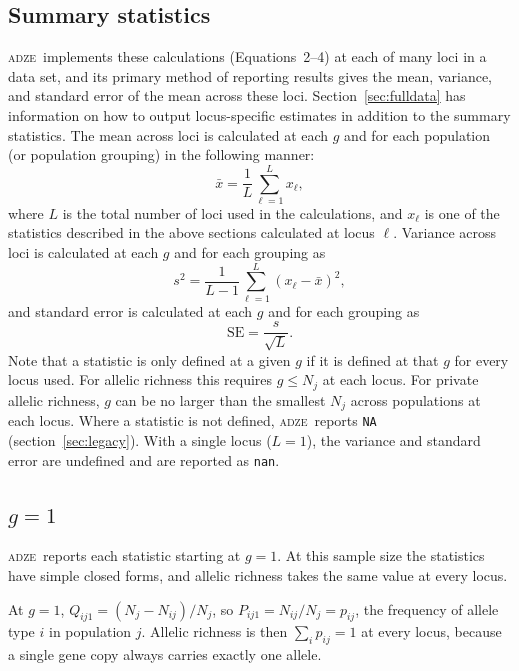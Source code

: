 \documentclass[11pt]{article}
\newcommand{\prog}{\textsc{adze}}
\begin{document}
\subsection{Summary statistics}
\label{sec:summarystats}

\prog\ implements these calculations (Equations~2--4) at each of many loci in
a data set, and its primary method of reporting results gives the mean,
variance, and standard error of the mean across these loci.
Section~\ref{sec:fulldata} has information on how to output locus-specific
estimates in addition to the summary statistics. The mean across loci is
calculated at each $g$ and for each population (or population grouping) in the
following manner:
\begin{equation}
  \bar{x} = \frac{1}{L} \sum_{\ell=1}^{L} x_\ell,
\end{equation}
where $L$ is the total number of loci used in the calculations, and $x_\ell$
is one of the statistics described in the above sections calculated at locus
$\ell$. Variance across loci is calculated at each $g$ and for each grouping
as
\begin{equation}
  s^2 = \frac{1}{L-1} \sum_{\ell=1}^{L} (x_\ell - \bar{x})^2,
\end{equation}
and standard error is calculated at each $g$ and for each grouping as
\begin{equation}
  \mathrm{SE} = \frac{s}{\sqrt{L}}.
\end{equation}
Note that a statistic is only defined at a given $g$ if it is defined at that
$g$ for every locus used. For allelic richness this requires $g \leq N_j$ at
each locus. For private allelic richness, $g$ can be no larger than the
smallest $N_j$ across populations at each locus. Where a statistic is not
defined, \prog\ reports \texttt{NA} (section~\ref{sec:legacy}). With a single
locus ($L = 1$), the variance and standard error are undefined and are reported
as \texttt{nan}.

\subsection{$g=1$}
\label{sec:gone}

\prog\ reports each statistic starting at $g = 1$. At this sample size the
statistics have simple closed forms, and allelic richness takes the same value
at every locus.

At $g = 1$, $Q_{ij1} = (N_j - N_{ij})/N_j$, so $P_{ij1} = N_{ij}/N_j = p_{ij}$,
the frequency of allele type $i$ in population $j$. Allelic richness is then
$\sum_i p_{ij} = 1$ at every locus, because a single gene copy always carries
exactly one allele.
\end{document}
